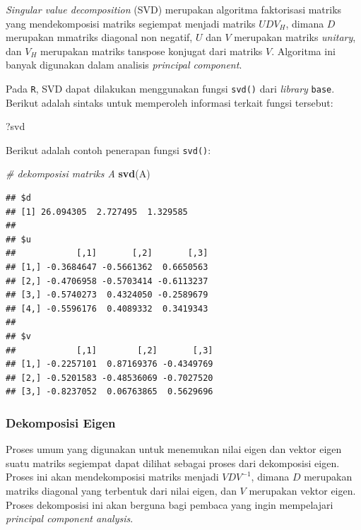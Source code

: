 \documentclass[]{book}
\newenvironment{Shaded}{\begin{snugshade}}{\end{snugshade}}
\newcommand{\CommentTok}[1]{\textcolor[rgb]{0.56,0.35,0.01}{\textit{#1}}}
\newcommand{\KeywordTok}[1]{\textcolor[rgb]{0.13,0.29,0.53}{\textbf{#1}}}
\newcommand{\NormalTok}[1]{#1}
\theoremstyle{definition}
\theoremstyle{definition}
\theoremstyle{definition}
\theoremstyle{remark}
\begin{document}
\emph{Singular value decomposition} (SVD) merupakan algoritma faktorisasi matriks yang mendekomposisi matriks segiempat menjadi matriks \(UDV_H\), dimana \(D\) merupakan mmatriks diagonal non negatif, \(U\) dan \(V\) merupakan matriks \emph{unitary}, dan \(V_H\) merupakan matriks tanspose konjugat dari matriks \(V\). Algoritma ini banyak digunakan dalam analisis \emph{principal component}.

Pada \texttt{R}, SVD dapat dilakukan menggunakan fungsi \texttt{svd()} dari \emph{library} \texttt{base}. Berikut adalah sintaks untuk memperoleh informasi terkait fungsi tersebut:

\begin{Shaded}
\begin{Highlighting}[]
\NormalTok{?svd}
\end{Highlighting}
\end{Shaded}

Berikut adalah contoh penerapan fungsi \texttt{svd()}:

\begin{Shaded}
\begin{Highlighting}[]
\CommentTok{# dekomposisi matriks A}
\KeywordTok{svd}\NormalTok{(A)}
\end{Highlighting}
\end{Shaded}

\begin{verbatim}
## $d
## [1] 26.094305  2.727495  1.329585
## 
## $u
##            [,1]       [,2]       [,3]
## [1,] -0.3684647 -0.5661362  0.6650563
## [2,] -0.4706958 -0.5703414 -0.6113237
## [3,] -0.5740273  0.4324050 -0.2589679
## [4,] -0.5596176  0.4089332  0.3419343
## 
## $v
##            [,1]        [,2]       [,3]
## [1,] -0.2257101  0.87169376 -0.4349769
## [2,] -0.5201583 -0.48536069 -0.7027520
## [3,] -0.8237052  0.06763865  0.5629696
\end{verbatim}

\hypertarget{eigendecomp}{%
\subsubsection{Dekomposisi Eigen}\label{eigendecomp}}

Proses umum yang digunakan untuk menemukan nilai eigen dan vektor eigen suatu matriks segiempat dapat dilihat sebagai proses dari dekomposisi eigen. Proses ini akan mendekomposisi matriks menjadi \(VDV^{-1}\), dimana \(D\) merupakan matriks diagonal yang terbentuk dari nilai eigen, dan \(V\) merupakan vektor eigen. Proses dekomposisi ini akan berguna bagi pembaca yang ingin mempelajari \emph{principal component analysis}.
\end{document}
